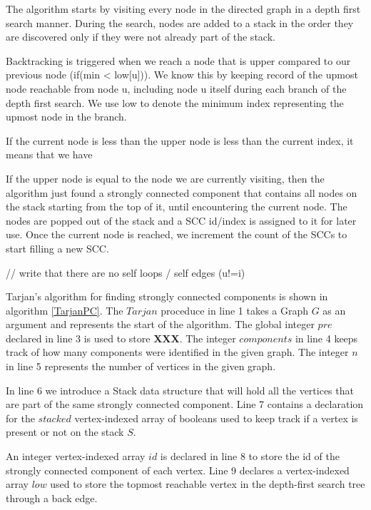 \documentclass{l4proj}
\begin{document}
\noindent The algorithm starts by visiting every node in the directed graph in a depth first search manner. During the search, nodes are added to a stack in the order they are discovered only if they were not already part of the stack. 

\noindent Backtracking is triggered when we reach a node that is upper compared to our previous node (if(min < low[u])).  We know this by keeping record of the upmost node reachable from node u, including node u itself during each branch of the depth first search. We use low to denote the minimum index representing the upmost node in the branch.

\noindent If the current node is less than the upper node is less than the current index, it means that we have 

\noindent If the upper node is equal to the node we are currently visiting, then the algorithm just found a strongly connected component that contains all nodes on the stack starting from the top of it, until encountering the current node. The nodes are popped out of the stack and a SCC id/index is assigned to it for later use. Once the current node is reached, we increment the count of the SCCs to start filling a new SCC.

\noindent // write that there are no self loops / self edges (u!=i)
\cite{tarjan1972depth}



\noindent Tarjan's algorithm for finding strongly connected components is shown in algorithm \ref{TarjanPC}. The $Tarjan$ proceduce in line 1 takes a Graph $G$ as an argument and represents the start of the algorithm. The global integer $pre$ declared in line 3 is used to store \textbf{XXX}. The integer $components$ in line 4 keeps track of how many components were identified in the given graph. The integer $n$ in line 5 represents the number of vertices in the given graph.

\noindent In line 6 we introduce a Stack data structure that will hold all the vertices that are part of the same strongly connected component. Line 7 contains a declaration for the $stacked$ vertex-indexed array of booleans used to keep track if a vertex is present or not on the stack $S$.

\noindent An integer vertex-indexed array $id$ is declared in line 8 to store the id of the strongly connected component of each vertex. Line 9 declares a vertex-indexed array $low$ used to store the topmost reachable vertex in the depth-first search tree through a back edge.
\end{document}
